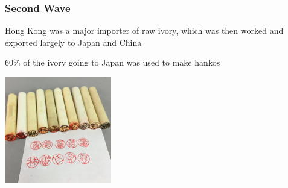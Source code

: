 \documentclass[10pt]{beamer}
\begin{document}
\begin{frame}[t]
\frametitle{Second Wave}
\vspace{0.5cm}

	Hong Kong was a major importer of raw ivory, which was then worked and exported largely to Japan and China\\
	
	\vspace{0.5cm}
	
	60\% of the ivory going to Japan was used to make \textcolor{myblue}{hankos}\\
	
	\vspace{0.25cm}
	
	\begin{center}
		\includegraphics[width=0.35\textwidth]{figures/hankos.jpg}
	\end{center}
\end{frame}
\end{document}

